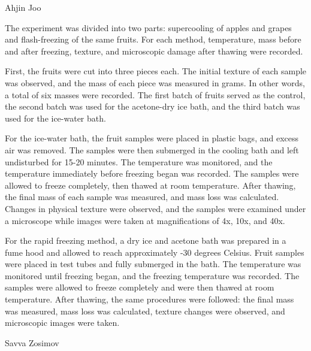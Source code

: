 Ahjin Joo

The experiment was divided into two parts: supercooling of apples and
grapes and flash-freezing of the same fruits. For each method,
temperature, mass before and after freezing, texture, and microscopic
damage after thawing were recorded.

First, the fruits were cut into three pieces each. The initial texture
of each sample was observed, and the mass of each piece was measured in
grams. In other words, a total of six masses were recorded. The first
batch of fruits served as the control, the second batch was used for the
acetone-dry ice bath, and the third batch was used for the ice-water
bath.

For the ice-water bath, the fruit samples were placed in plastic bags,
and excess air was removed. The samples were then submerged in the
cooling bath and left undisturbed for 15-20 minutes. The temperature was
monitored, and the temperature immediately before freezing began was
recorded. The samples were allowed to freeze completely, then thawed at
room temperature. After thawing, the final mass of each sample was
measured, and mass loss was calculated. Changes in physical texture were
observed, and the samples were examined under a microscope while images
were taken at magnifications of 4x, 10x, and 40x.

For the rapid freezing method, a dry ice and acetone bath was prepared
in a fume hood and allowed to reach approximately -30 degrees Celsius.
Fruit samples were placed in test tubes and fully submerged in the bath.
The temperature was monitored until freezing began, and the freezing
temperature was recorded. The samples were allowed to freeze completely
and were then thawed at room temperature. After thawing, the same
procedures were followed: the final mass was measured, mass loss was
calculated, texture changes were observed, and microscopic images were
taken.

Savva Zosimov

